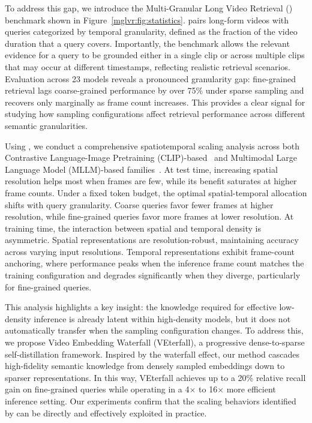 To address this gap, we introduce the Multi-Granular Long Video Retrieval (\benchmarkname) benchmark shown in Figure~\ref{mglvr:fig:statistics}. \benchmarkname pairs long-form videos with queries categorized by temporal granularity, defined as the fraction of the video duration that a query covers. Importantly, the benchmark allows the relevant evidence for a query to be grounded either in a single clip or across multiple clips that may occur at different timestamps, reflecting realistic retrieval scenarios. Evaluation across 23 models reveals a pronounced granularity gap: fine-grained retrieval lags coarse-grained performance by over 75\% under sparse sampling and recovers only marginally as frame count increases. This provides a clear signal for studying how sampling configurations affect retrieval performance across different semantic granularities.

Using \benchmarkname, we conduct a comprehensive spatiotemporal scaling analysis across both Contrastive Language-Image Pretraining (CLIP)-based~\cite{gorti2022x} and Multimodal Large Language Model (MLLM)-based families~\cite{kong2025modality}. At test time, increasing spatial resolution helps most when frames are few, while its benefit saturates at higher frame counts. Under a fixed token budget, the optimal spatial-temporal allocation shifts with query granularity. Coarse queries favor fewer frames at higher resolution, while fine-grained queries favor more frames at lower resolution. At training time, the interaction between spatial and temporal density is asymmetric. Spatial representations are resolution-robust, maintaining accuracy across varying input resolutions. Temporal representations exhibit frame-count anchoring, where performance peaks when the inference frame count matches the training configuration and degrades significantly when they diverge, particularly for fine-grained queries.

This analysis highlights a key insight: the knowledge required for effective low-density inference is already latent within high-density models, but it does not automatically transfer when the sampling configuration changes. To address this, we propose Video Embedding Waterfall (VEterfall), a progressive dense-to-sparse self-distillation framework. Inspired by the waterfall effect, our method cascades high-fidelity semantic knowledge from densely sampled embeddings down to sparser representations. In this way, VEterfall achieves up to a 20\% relative recall gain on fine-grained queries while operating in a 4$\times$ to 16$\times$ more efficient inference setting. Our experiments confirm that the scaling behaviors identified by \benchmarkname can be directly and effectively exploited in practice.

